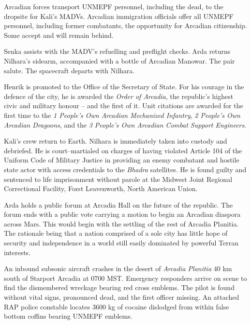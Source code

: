 Arcadian forces transport UNMEPF personnel, including the dead, to the dropsite for Kali's MADVs. Arcadian immigration officials offer all UNMEPF personnel, including former combatants, the opportunity for Arcadian citizenship. Some accept and will remain behind. 

Senka assists with the MADV's refuelling and preflight checks. Arda returns Nilhara's sidearm, accompanied with a bottle of Arcadian Manowar. The pair salute. The spacecraft departs with Nilhara.
\StopTimelineDate

Henrik is promoted to the Office of the Secretary of State. For his courage in the defence of the city, he is awarded the {\it Order of Arcadia}, the republic's highest civic and military honour -- and the first of it. Unit citations are awarded for the first time to the {\it 1 People's Own Arcadian Mechanized Infantry}, {\it 2 People's Own Arcadian Dragoons}, and the {\it 3 People's Own Arcadian Combat Support Engineers}.
\StopTimelineDate

Kali's crew return to Earth. Nilhara is immediately taken into custody and debriefed. He is court--martialed on charges of having violated Article 104 of the Uniform Code of Military Justice in providing an enemy combatant and hostile state actor with access credentials to the {\it Bhadra} satellites. He is found guilty and sentenced to life imprisonment without parole at the Midwest Joint Regional Correctional Facility, Forst Leavenworth, North American Union.
\StopTimelineDate

Arda holds a public forum at Arcadia Hall on the future of the republic. The forum ends with a public vote carrying a motion to begin an Arcadian diaspora across Mars. This would begin with the settling of the rest of Arcadia Planitia. The rationale being that a nation comprised of a sole city has little hope of security and independence in a world still easily dominated by powerful Terran interests.
\StopTimelineDate

An inbound subsonic aircraft crashes in the desert of {\it Arcadia Planitia} 40 km south of Starport Arcadia at 0700 MST. Emergency responders arrive on scene to find the dismembered wreckage bearing red cross emblems. The pilot is found without vital signs, pronounced dead, and the first officer missing. An attached RAP police constable locates 3600 kg of cocaine dislodged from within false bottom coffins bearing UNMEPF emblems.

